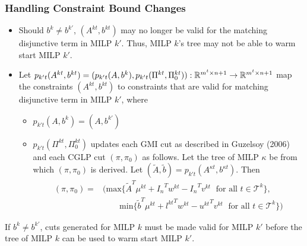 \documentclass{beamer}
\begin{document}
	\begin{frame}[t]
		\frametitle{Handling Constraint Bound Changes}
		\small
		\vspace{-.25cm}
		\begin{itemize}
			\item Should $ b^k \neq b^{k'} $, $ (A^{kt}, b^{kt}) $ may no longer be valid for the matching disjunctive term in MILP $ k' $. Thus, MILP $ k $'s tree may not be able to warm start MILP $ k' $.
			
			\item Let $ p_{k't}(A^{kt}, b^{kt}) = (p_{k't}(A, b^k), p_{k't}(\Pi^{kt}, \Pi_0^{kt})) : \mathbb{R}^{m^t \times n + 1} \rightarrow \mathbb{R}^{m^t \times n + 1} $ map the constraints $ (A^{kt}, b^{kt}) $ to constraints that are valid for matching disjunctive term in MILP $ k' $, where
			\begin{itemize}
				\item $ p_{k't}(A, b^k) = (A, b^{k'}) $
				\item $ p_{k't}(\Pi^{kt}, \Pi_0^{kt}) $ updates each GMI cut as described in Guzelsoy (2006) and each CGLP cut $ (\pi, \pi_0) $ as follows. Let the tree of MILP $ \kappa $ be from which $ (\pi, \pi_0) $ is derived. Let $ (\tilde{A}, \tilde{b}) = p_{k't}(A^{\kappa t}, b^{\kappa t}) $. Then
				\begin{align*}
					(\pi, \pi_0) =& (\text{max} \{\tilde{A}^T \mu^{kt} + {I_n}^T w^{kt} - {I_n}^T v^{kt} \; \text{ for all } t \in \mathcal{T}^k\}, \\
					& \qquad \text{min} \{\tilde{b}^T \mu^{kt} + {l^{kt}}^T w^{kt} - {u^{kt}}^T v^{kt} \; \text{ for all } t \in \mathcal{T}^k\})
				\end{align*}
			\end{itemize}
		\end{itemize}
		\vspace{-.25cm}
		\begin{block}{}
			If $ b^k \neq b^{k'} $, cuts generated for MILP $ k $ must be made valid for MILP $ k' $ before the tree of MILP $ k $ can be used to warm start MILP $ k' $.
		\end{block}
		\normalsize
	\end{frame}
	
\end{document}
